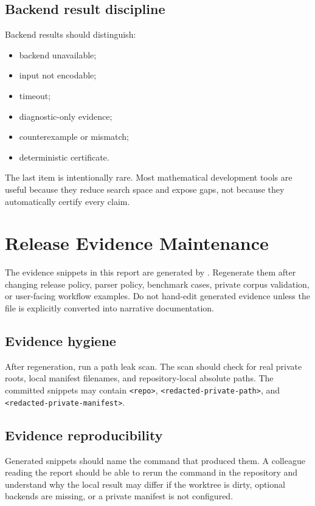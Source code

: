 \documentclass[12pt,a4paper,openany]{book}
\begin{document}
\section{Backend result discipline}

Backend results should distinguish:

\begin{itemize}
  \item backend unavailable;
  \item input not encodable;
  \item timeout;
  \item diagnostic-only evidence;
  \item counterexample or mismatch;
  \item deterministic certificate.
\end{itemize}

The last item is intentionally rare. Most mathematical development tools are
useful because they reduce search space and expose gaps, not because they
automatically certify every claim.

\chapter{Release Evidence Maintenance}

The evidence snippets in this report are generated by
. Regenerate them after
changing release policy, parser policy, benchmark cases, private corpus
validation, or user-facing workflow examples. Do not hand-edit generated
evidence unless the file is explicitly converted into narrative documentation.

\section{Evidence hygiene}

After regeneration, run a path leak scan. The scan should check for real private
roots, local manifest filenames, and repository-local absolute paths. The
committed snippets may contain \texttt{<repo>},
\texttt{<redacted-private-path>}, and
\texttt{<redacted-private-manifest>}.

\section{Evidence reproducibility}

Generated snippets should name the command that produced them. A colleague
reading the report should be able to rerun the command in the repository and
understand why the local result may differ if the worktree is dirty, optional
backends are missing, or a private manifest is not configured.
\end{document}
